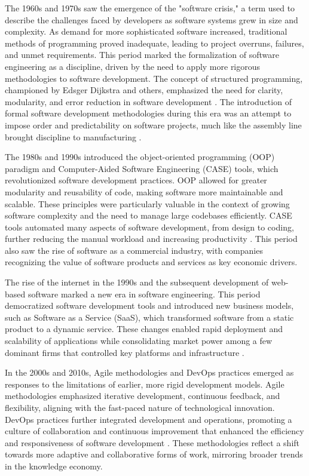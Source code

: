\begin{refsection}
The 1960s and 1970s saw the emergence of the "software crisis," a term used to describe the challenges faced by developers as software systems grew in size and complexity. As demand for more sophisticated software increased, traditional methods of programming proved inadequate, leading to project overruns, failures, and unmet requirements. This period marked the formalization of software engineering as a discipline, driven by the need to apply more rigorous methodologies to software development. The concept of structured programming, championed by Edsger Dijkstra and others, emphasized the need for clarity, modularity, and error reduction in software development \cite[pp.~10-13]{dijkstra1976discipline}. The introduction of formal software development methodologies during this era was an attempt to impose order and predictability on software projects, much like the assembly line brought discipline to manufacturing \cite[pp.~70-74]{pressman2019software}.

The 1980s and 1990s introduced the object-oriented programming (OOP) paradigm and Computer-Aided Software Engineering (CASE) tools, which revolutionized software development practices. OOP allowed for greater modularity and reusability of code, making software more maintainable and scalable. These principles were particularly valuable in the context of growing software complexity and the need to manage large codebases efficiently. CASE tools automated many aspects of software development, from design to coding, further reducing the manual workload and increasing productivity \cite[pp.~204-208]{gamma2015design}. This period also saw the rise of software as a commercial industry, with companies recognizing the value of software products and services as key economic drivers.

The rise of the internet in the 1990s and the subsequent development of web-based software marked a new era in software engineering. This period democratized software development tools and introduced new business models, such as Software as a Service (SaaS), which transformed software from a static product to a dynamic service. These changes enabled rapid deployment and scalability of applications while consolidating market power among a few dominant firms that controlled key platforms and infrastructure \cite[pp.~120-123]{cassidy2005dot}.

In the 2000s and 2010s, Agile methodologies and DevOps practices emerged as responses to the limitations of earlier, more rigid development models. Agile methodologies emphasized iterative development, continuous feedback, and flexibility, aligning with the fast-paced nature of technological innovation. DevOps practices further integrated development and operations, promoting a culture of collaboration and continuous improvement that enhanced the efficiency and responsiveness of software development \cite[pp.~56-60]{west2014devops}. These methodologies reflect a shift towards more adaptive and collaborative forms of work, mirroring broader trends in the knowledge economy.


\end{refsection}
